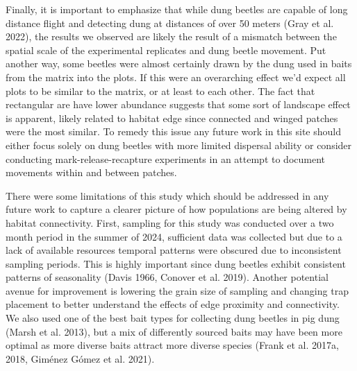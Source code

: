 \documentclass[
  man, donotrepeattitle]{apa6}
\begin{document}
Finally, it is important to emphasize that while dung beetles are capable of long distance flight and detecting dung at distances of over 50 meters (Gray et al. 2022), the results we observed are likely the result of a mismatch between the spatial scale of the experimental replicates and dung beetle movement. Put another way, some beetles were almost certainly drawn by the dung used in baits from the matrix into the plots. If this were an overarching effect we'd expect all plots to be similar to the matrix, or at least to each other. The fact that rectangular are have lower abundance suggests that some sort of landscape effect is apparent, likely related to habitat edge since connected and winged patches were the most similar. To remedy this issue any future work in this site should either focus solely on dung beetles with more limited dispersal ability or consider conducting mark-release-recapture experiments in an attempt to document movements within and between patches.

There were some limitations of this study which should be addressed in any future work to capture a clearer picture of how populations are being altered by habitat connectivity. First, sampling for this study was conducted over a two month period in the summer of 2024, sufficient data was collected but due to a lack of available resources temporal patterns were obscured due to inconsistent sampling periods. This is highly important since dung beetles exhibit consistent patterns of seasonality (Davis 1966, Conover et al. 2019). Another potential avenue for improvement is lowering the grain size of sampling and changing trap placement to better understand the effects of edge proximity and connectivity. We also used one of the best bait types for collecting dung beetles in pig dung (Marsh et al. 2013), but a mix of differently sourced baits may have been more optimal as more diverse baits attract more diverse species (Frank et al. 2017a, 2018, Giménez Gómez et al. 2021).
\end{document}
